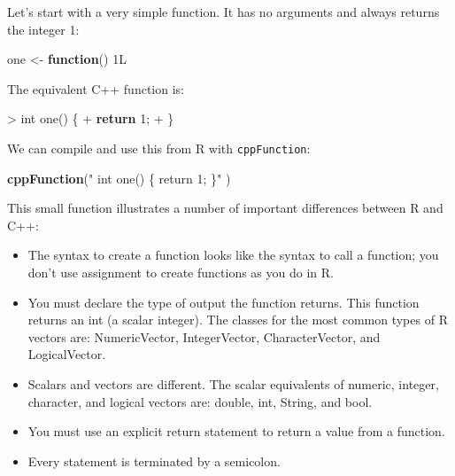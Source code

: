 \documentclass[
]{krantz}
\makeatletter
\newenvironment{Shaded}{\begin{snugshade}}{\end{snugshade}}
\newcommand{\ControlFlowTok}[1]{\textcolor[rgb]{0.27,0.27,0.27}{\textbf{#1}}}
\newcommand{\DataTypeTok}[1]{\textcolor[rgb]{0.27,0.27,0.27}{#1}}
\newcommand{\DecValTok}[1]{\textcolor[rgb]{0.06,0.06,0.06}{#1}}
\newcommand{\KeywordTok}[1]{\textcolor[rgb]{0.27,0.27,0.27}{\textbf{#1}}}
\newcommand{\NormalTok}[1]{#1}
\newcommand{\StringTok}[1]{\textcolor[rgb]{0.5,0.5,0.5}{#1}}
\providecommand{\tightlist}{%
  \setlength{\itemsep}{0pt}\setlength{\parskip}{0pt}}
\newenvironment{kframe}{%
\medskip{}
\setlength{\fboxsep}{.8em}
 \def\at@end@of@kframe{}%
 \ifinner\ifhmode%
  \def\at@end@of@kframe{\end{minipage}}%
  \begin{minipage}{\columnwidth}%
 \fi\fi%
 \def\FrameCommand##1{\hskip\@totalleftmargin \hskip-\fboxsep
 \colorbox{shadecolor}{##1}\hskip-\fboxsep
     \hskip-\linewidth \hskip-\@totalleftmargin \hskip\columnwidth}%
 \MakeFramed {\advance\hsize-\width
   \@totalleftmargin\z@ \linewidth\hsize
   \@setminipage}}%
 {\par\unskip\endMakeFramed%
 \at@end@of@kframe}
\renewenvironment{Shaded}{\begin{kframe}}{\end{kframe}}
\makeatother
\begin{document}
Let's start with a very simple function. It has no arguments and always returns the integer 1:

\begin{Shaded}
\begin{Highlighting}[]
\NormalTok{one \textless{}{-}}\StringTok{ }\ControlFlowTok{function}\NormalTok{() 1L}
\end{Highlighting}
\end{Shaded}

The equivalent C++ function is:

\begin{Shaded}
\begin{Highlighting}[]
\NormalTok{\textgreater{} }\DataTypeTok{int}\NormalTok{ one() \{}
\NormalTok{+   }\ControlFlowTok{return} \DecValTok{1}\NormalTok{;}
\NormalTok{+ \}}
\end{Highlighting}
\end{Shaded}

We can compile and use this from R with \texttt{cppFunction}:

\begin{Shaded}
\begin{Highlighting}[]
\KeywordTok{cppFunction}\NormalTok{(}\StringTok{"}
\StringTok{  int one() \{}
\StringTok{    return 1;}
\StringTok{  \}"}
\NormalTok{)}
\end{Highlighting}
\end{Shaded}

This small function illustrates a number of important differences between R and C++:

\begin{itemize}
\tightlist
\item
  The syntax to create a function looks like the syntax to call a function; you don't use assignment to create functions as you do in R.
\item
  You must declare the type of output the function returns. This function returns an int (a scalar integer). The classes for the most common types of R vectors are: NumericVector, IntegerVector, CharacterVector, and LogicalVector.
\item
  Scalars and vectors are different. The scalar equivalents of numeric, integer, character, and logical vectors are: double, int, String, and bool.
\item
  You must use an explicit return statement to return a value from a function.
\item
  Every statement is terminated by a semicolon.
\end{itemize}
\end{document}
